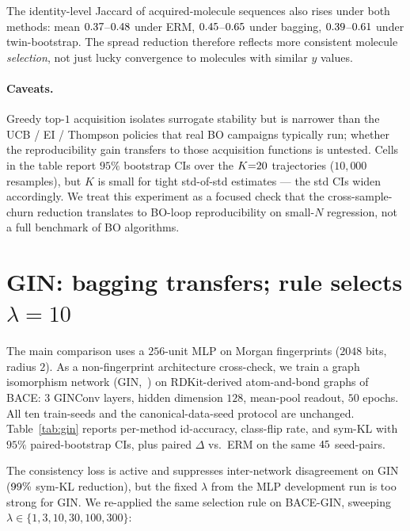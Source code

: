 The identity-level Jaccard of acquired-molecule sequences also
rises under both methods: mean
$0.37$--$0.48$ under ERM,
$0.45$--$0.65$ under bagging,
$0.39$--$0.61$ under
twin-bootstrap.  The spread reduction therefore reflects more
consistent molecule \emph{selection}, not just lucky convergence to
molecules with similar $y$ values.

\paragraph{Caveats.}
Greedy top-$1$ acquisition isolates surrogate stability but is
narrower than the UCB / EI / Thompson policies that real BO
campaigns typically run; whether the reproducibility gain transfers
to those acquisition functions is untested.  Cells in the table
report $95\%$ bootstrap CIs over the $K{=}20$ trajectories
($10{,}000$ resamples), but $K$ is small for tight std-of-std
estimates --- the std CIs widen accordingly.  We treat
this experiment as a focused check that the cross-sample-churn
reduction translates to BO-loop reproducibility on small-$N$
regression, not a full benchmark of BO algorithms.

\section{\boldmath GIN: bagging transfers; rule selects $\lambda{=}10$}
\label{app:gin}

The main comparison uses a $256$-unit MLP on Morgan fingerprints
($2048$ bits, radius $2$).  As a non-fingerprint architecture
cross-check, we train a graph isomorphism network
(GIN,~\citealp{xu_gin}) on RDKit-derived atom-and-bond
graphs of BACE: $3$ GINConv layers, hidden dimension $128$, mean-pool
readout, $50$ epochs.  All ten train-seeds and the canonical-data-seed
protocol are unchanged.  Table~\ref{tab:gin} reports per-method
id-accuracy, class-flip rate, and sym-KL with $95\%$ paired-bootstrap
CIs, plus paired $\Delta$ vs.\ ERM on the same $45$ seed-pairs.



The consistency loss is active and suppresses inter-network
disagreement on GIN ($99\%$ sym-KL reduction),
but the fixed $\lambda$ from the MLP development run is too strong
for GIN.  We re-applied the same selection rule on
BACE-GIN, sweeping $\lambda \in \{1, 3, 10, 30, 100, 300\}$:

